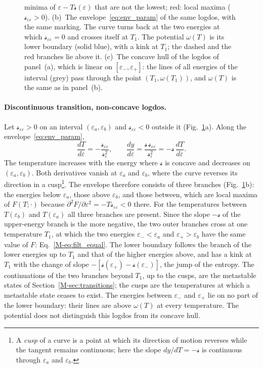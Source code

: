 \documentclass[10pt,a4paper]{article}
\theoremstyle{plain}
\theoremstyle{remark}
\newcommand{\lndos}{{logdos}}  %
\newcommand{\lds}{\mathscr{s}}  %
\begin{document}
\begin{figure}[htbp]
{minima of $\varepsilon-T\lds(\varepsilon)$ that are not the lowest; red:
local maxima ($\lds_{\varepsilon\varepsilon}>0$).
(b)~The envelope~\eqref{eq:env_param} of the same \lndos{}, with the same
marking. The curve turns back at the two energies at which
$\lds_{\varepsilon\varepsilon}=0$ and crosses itself at $T_1$. The potential
$\omega(T)$ is its lower boundary (solid blue), with a kink at $T_1$; the
dashed and the red branches lie above it.
(c)~The concave hull of the \lndos{} of panel~(a), which is linear on
$[\varepsilon_-,\varepsilon_+]$: the lines of all energies of the interval
(grey) pass through the point $(T_1,\omega(T_1))$, and $\omega(T)$ is the
same as in panel~(b).}
\label{fig:swallowtail}
\end{figure}

\paragraph{Discontinuous transition, non-concave \lndos.} Let
$\lds_{\varepsilon\varepsilon}>0$ on an interval
$(\varepsilon_a,\varepsilon_b)$ and $\lds_{\varepsilon\varepsilon}<0$
outside it (Fig.~\ref{fig:swallowtail}a). Along the
envelope~\eqref{eq:env_param},
\[
  \frac{dT}{d\varepsilon}=-\frac{\lds_{\varepsilon\varepsilon}}{\lds_\varepsilon^{2}} ,
  \qquad
  \frac{dy}{d\varepsilon}=\frac{\lds\,\lds_{\varepsilon\varepsilon}}{\lds_\varepsilon^{2}}
  =-\lds\,\frac{dT}{d\varepsilon} .
\]
The temperature increases with the energy where $\lds$ is concave and
decreases on $(\varepsilon_a,\varepsilon_b)$. Both derivatives vanish at
$\varepsilon_a$ and $\varepsilon_b$, where the curve reverses its direction
in a cusp\footnote{A \emph{cusp} of a curve is a point at which its
direction of motion reverses while the tangent remains continuous; here the
slope $dy/dT=-\lds$ is continuous through $\varepsilon_a$ and
$\varepsilon_b$.}. The envelope therefore consists of three branches
(Fig.~\ref{fig:swallowtail}b): the energies below $\varepsilon_a$, those
above $\varepsilon_b$, and those between, which are local maxima of
$F(T;\cdot)$ because
$\partial^{2}F/\partial\varepsilon^{2}=-T\lds_{\varepsilon\varepsilon}<0$
there. For the temperatures between $T(\varepsilon_b)$ and
$T(\varepsilon_a)$ all three branches are present. Since the slope
$-\lds$ of the upper-energy branch is the more negative, the two outer
branches cross at one temperature $T_1$, at which the two energies
$\varepsilon_-<\varepsilon_a$ and $\varepsilon_+>\varepsilon_b$ have the
same value of $F$: Eq.~\eqref{M-eq:filt_equal}. The lower boundary follows
the branch of the lower energies up to $T_1$ and that of the higher
energies above, and has a kink at $T_1$ with the change of slope
$-[\lds(\varepsilon_+)-\lds(\varepsilon_-)]$, the jump of the entropy. The
continuations of the two branches beyond $T_1$, up to the cusps, are the
metastable states of Section~\ref{M-sec:transitions}; the cusps are the
temperatures at which a metastable state ceases to exist. The energies
between $\varepsilon_-$ and $\varepsilon_+$ lie on no part of the lower
boundary: their lines are above $\omega(T)$ at every temperature. The
potential does not distinguish this \lndos{} from its concave hull.
\end{document}
